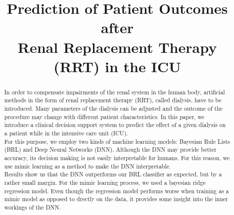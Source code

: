 \documentclass[conference,compsoc]{IEEEtran}
\begin{document}
\title{Prediction of Patient Outcomes after \\Renal Replacement Therapy (RRT) in the ICU }


\author{
\and
{}
}
\maketitle

\begin{abstract}
In order to compensate impairments of the renal system in the human body, artificial methods in the form of renal replacement therapy (RRT), called dialysis, have to be introduced.
Many parameters of the dialysis can be adjusted and the outcome of the procedure may change with different patient characteristics. 
In this paper, we introduce a clinical decision support system to predict the effect of a given dialysis on a patient while in the intensive care unit (ICU). \\
For this purpose, we employ two kinds of machine learning models: Bayesian Rule Lists (BRL) and Deep Neural Networks (DNN). Although the DNN may provide better accuracy, its decision making is not easily interpretable for humans. For this reason, we use mimic learning as a method to make the DNN interpretable. \\
Results show us that the DNN outperforms our BRL classifier as expected, but by a rather small margin.
For the mimic learning process, we used a bayesian ridge regression model.
Even though the regression model performs worse when training as a mimic model as opposed to drectly on the data, it provides some insight into the inner workings of the DNN.
\end{abstract}
\end{document}
